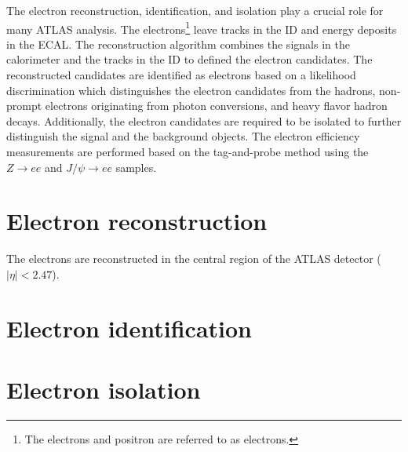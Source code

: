 The electron reconstruction, identification, and isolation play a crucial role for many ATLAS analysis.
The electrons\footnote{The electrons and positron are referred to as electrons.} leave tracks in the ID and energy deposits in the ECAL.
The reconstruction algorithm combines the signals in the calorimeter and the tracks in the ID to defined the electron candidates.
The reconstructed candidates are identified as electrons based on a likelihood discrimination which distinguishes the electron candidates from the hadrons, non-prompt electrons originating from photon conversions, and heavy flavor hadron decays.
Additionally, the electron candidates are required to be isolated to further distinguish the signal and the background objects.
The electron efficiency measurements are performed based on the tag-and-probe method using the $Z \to ee$ and $J/\psi \to ee$ samples.


\section{Electron reconstruction}
\label{sec:app_electron_reconstruction}
The electrons are reconstructed in the central region of the ATLAS detector ($|\eta| < 2.47$).

\section{Electron identification}
\label{sec:app_electron_identification}


\section{Electron isolation}
\label{sec:app_electron_isolation}

